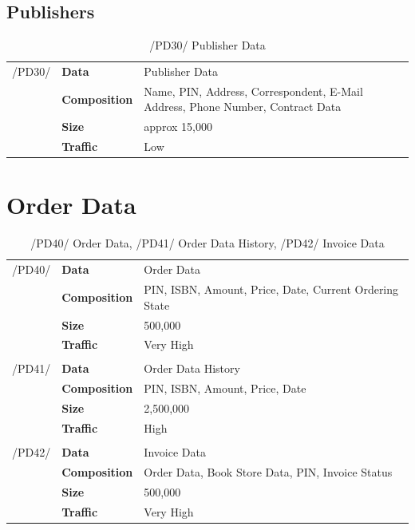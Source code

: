 \documentclass[11pt,a4paper,oneside,svgnames]{report}
\begin{document}
\subsection{Publishers}
\begin{table}[H]
\centering
\begin{tabular}{llp{8.75cm}}
\cellcolor{white}/PD30/	& \textbf{Data}			& Publisher Data\\
\cellcolor{white}		& \textbf{Composition}	& Name, PIN, Address, Correspondent, E-Mail Address, Phone Number, Contract Data\\
\cellcolor{white}		& \textbf{Size}		& approx 15,000\\
\cellcolor{white}		& \textbf{Traffic}		& Low\\
\end{tabular}
\caption{/PD30/ Publisher Data}
\label{tab:pd30}
\end{table}


\section{Order Data}
\begin{table}[H]
\centering
\begin{tabular}{llp{8.75cm}}
\cellcolor{white}/PD40/	& \textbf{Data}			& Order Data\\
\cellcolor{white}		& \textbf{Composition}	& PIN, ISBN, Amount, Price, Date, Current Ordering State\\
\cellcolor{white}		& \textbf{Size}		& 500,000\\
\cellcolor{white}		& \textbf{Traffic}		& Very High\\
\cellcolor{white}\hfill \\
\cellcolor{white}/PD41/	& \textbf{Data}			& Order Data History\\
\cellcolor{white}		& \textbf{Composition}	& PIN, ISBN, Amount, Price, Date\\
\cellcolor{white}		& \textbf{Size}		& 2,500,000\\
\cellcolor{white}		& \textbf{Traffic}		& High\\
\cellcolor{white}\hfill \\
\cellcolor{white}/PD42/	& \textbf{Data}			& Invoice Data\\
\cellcolor{white}		& \textbf{Composition}	& Order Data, Book Store Data, PIN, Invoice Status\\
\cellcolor{white}		& \textbf{Size}		& 500,000\\
\cellcolor{white}		& \textbf{Traffic}		& Very High\\
\end{tabular}
\caption{/PD40/ Order Data, /PD41/ Order Data History, /PD42/ Invoice Data}
\label{tab:pd40+}
\end{table}
\end{document}
